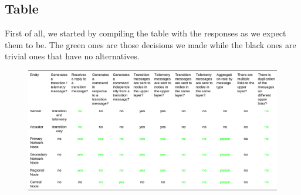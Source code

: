 \documentclass[11pt]{article}
\begin{document}
\subsection{Table}
First of all, we started by compiling the table with the responses as we expect them to be. The green ones are those decisions we made while the black ones are trivial ones that have no alternatives.\\
\begin{figure}[H]
	\hspace*{-3.5cm}
	\includegraphics[width=20cm]{table.png}
\end{figure}
\end{document}
